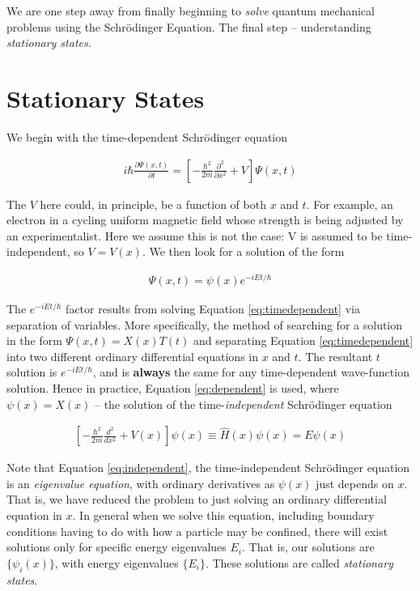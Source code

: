We are one step away from finally beginning to \textit{solve} quantum
mechanical problems using the Schr\"odinger Equation. The final step --
understanding \textit{stationary states}. 

\section{Stationary States}

We begin with the time-dependent Schr\"odinger equation

\begin{align} \label{eq:timedependent}
i\hbar \frac{\partial \Psi(x, t)}{\partial t} = \left[ -\frac{\hbar^2}{2m}
\frac{\partial^2 }{\partial x^2} + V\right] \Psi(x, t)
\end{align}

The $V$ here could, in principle, be a function of both $x$ and $t$. For
example, an electron in a cycling uniform magnetic field whose strength is
being adjusted by an experimentalist. Here we assume this is not the case: V is
assumed to be time-independent, so $V=V(x)$. We then look for a solution of the
form 

\begin{align} \label{eq:dependent}
  \Psi(x, t) = \psi(x)e^{-iEt/\hbar}
\end{align}

The $e^{-iEt/\hbar}$ factor results from solving Equation \ref{eq:timedependent}
via separation of variables. More specifically, the method of searching for
a solution in the form $\Psi(x, t) = X(x)T(t)$ and separating Equation \ref{eq:timedependent} into two
different ordinary differential equations in $x$ and $t$. The resultant $t$
solution is $e^{-iEt/\hbar}$, and is \textbf{always} the same for any time-dependent
wave-function solution. Hence in practice, Equation \ref{eq:dependent} is used, where
$\psi(x) = X(x)$ -- the solution of the time-\textit{independent} Schr\"odinger
equation

\begin{align} \label{eq:independent}
  \left[ -\frac{\hbar^2}{2m} \frac{d^2 }{d x^2} + V(x) \right] \psi(x) \equiv
  \hat{H}(x) \psi(x) = E\psi(x) 
\end{align} \vspace{3px}

Note that Equation \ref{eq:independent}, the time-independent Schr\"odinger
equation is an \textit{eigenvalue equation}, with ordinary derivatives as
$\psi(x)$ just depends on $x$. That is, we have reduced the problem to just
solving an ordinary differential equation in $x$.  In general when we solve this equation, including boundary conditions having to
do with how a particle may be confined, there will exist solutions only for
specific energy eigenvalues $E_i$. That is, our solutions are $\{\psi_i(x)\}$,
with energy eigenvalues $\{E_i\}$. These solutions are called
\textit{stationary states}.


